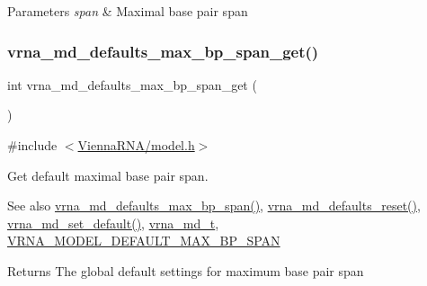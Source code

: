 \begin{DoxyParams}{Parameters}
{\em span} & Maximal base pair span \\
\hline
\end{DoxyParams}
\mbox{\label{group__model__details_gaa60f989e062fecd4d4bac89c1883da85}} 
\subsubsection{\texorpdfstring{vrna\+\_\+md\+\_\+defaults\+\_\+max\+\_\+bp\+\_\+span\+\_\+get()}{vrna\_md\_defaults\_max\_bp\_span\_get()}}
{\footnotesize\ttfamily int vrna\+\_\+md\+\_\+defaults\+\_\+max\+\_\+bp\+\_\+span\+\_\+get (\begin{DoxyParamCaption}\item[{void}]{ }\end{DoxyParamCaption})}



{\ttfamily \#include $<$\mbox{\hyperlink{model_8h}{Vienna\+R\+N\+A/model.\+h}}$>$}



Get default maximal base pair span. 

\begin{DoxySeeAlso}{See also}
\mbox{\hyperlink{group__model__details_ga4c4bc962f09b4480cb8499f1cf8ae4ec}{vrna\+\_\+md\+\_\+defaults\+\_\+max\+\_\+bp\+\_\+span()}}, \mbox{\hyperlink{group__model__details_ga70834424cf804d149937de89f80ceb45}{vrna\+\_\+md\+\_\+defaults\+\_\+reset()}}, \mbox{\hyperlink{group__model__details_ga8ac6ff84936282436f822644bf841f66}{vrna\+\_\+md\+\_\+set\+\_\+default()}}, \mbox{\hyperlink{group__model__details_ga1f8a10e12a0a1915f2a4eff0b28ea17c}{vrna\+\_\+md\+\_\+t}}, \mbox{\hyperlink{group__model__details_ga7cb6f4ae8fdebff6746a4410814f2977}{V\+R\+N\+A\+\_\+\+M\+O\+D\+E\+L\+\_\+\+D\+E\+F\+A\+U\+L\+T\+\_\+\+M\+A\+X\+\_\+\+B\+P\+\_\+\+S\+P\+AN}} 
\end{DoxySeeAlso}
\begin{DoxyReturn}{Returns}
The global default settings for maximum base pair span 
\end{DoxyReturn}
\mbox{\label{group__model__details_gac152f1e78c1058a10261022c8dfda0f7}} 
